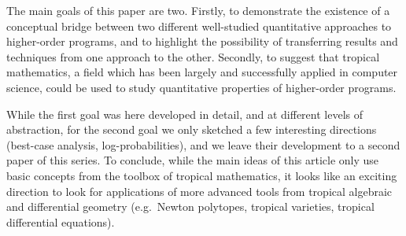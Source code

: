 
%
%
%

The main goals of this paper are two. Firstly,  to
demonstrate the existence of a conceptual bridge between two different well-studied quantitative approaches to higher-order programs, and to highlight the possibility of transferring results and techniques from one approach to the other. 
Secondly, to suggest that tropical mathematics, a
field which has been largely and successfully applied in computer science, could be used to study quantitative properties of higher-order programs.

While the first goal was here developed in detail, and at different levels of abstraction, for the second goal we only sketched a few interesting directions (best-case analysis, log-probabilities), and we leave their development to a second paper of this series. 
To conclude, while the main ideas of this article only use basic concepts from the toolbox of tropical mathematics, it looks like an exciting direction to look for applications of more advanced tools from tropical algebraic and differential geometry (e.g.~Newton polytopes, tropical varieties, tropical differential equations). 


